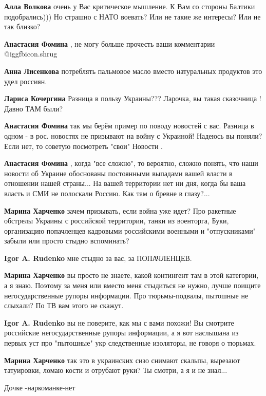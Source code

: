 \begin{itemize}
\begin{itemize}
\textbf{Алла Волкова} очень у Вас критическое мышление. К Вам со стороны Балтики подобрались))) Но страшно с НАТО воевать? Или не такие же интересы? Или не так близко?

\textbf{Анастасия Фомина} , не могу больше прочесть ваши комментарии  @igg{fbicon.shrug} 

\textbf{Анна Лисенкова} потреблять пальмовое масло вместо натуральных продуктов это удел россиян.

\textbf{Лариса Кочергина} Разница в пользу Украины??? Ларочка, вы такая сказочница !
Давно ТАМ были?

\textbf{Анастасия Фомина} так мы берём пример по поводу новостей с вас. Разница в одном - в рос. новостях не призывают на войну с Украиной! Надеюсь вы поняли? Если нет, то советую посмотреть "свои" Новости .

\textbf{Анастасия Фомина} , когда "все сложно", то вероятно, сложно понять, что наши новости об Украине обоснованы постоянными выпадами вашей власти в отношении нашей страны... На вашей территории нет ни дня, когда бы ваша власть и СМИ не полоскали Россию. Как там о бревне в глазу?...

\textbf{Марина Харченко} зачем призывать, если война уже идет? Про ракетные обстрелы Украины с российской территории, танки из военторга, Буки, организацию попачленцев кадровыми российскими военными и "отпускниками" забыли или просто стыдно вспоминать?

\textbf{Igor A. Rudenko} мне стыдно за вас, за ПОПАЧЛЕНЦЕВ.

\textbf{Марина Харченко} вы просто не знаете, какой контингент там в этой категории, а я знаю. Поэтому за меня или вместо меня стыдиться не нужно, лучше поищите негосударственные рупоры информации. Про тюрьмы-подвалы, пытошные не слыхали? По ТВ вам этого не скажут.

\textbf{Igor A. Rudenko} вы не поверите, как мы с вами похожи! Вы смотрите российские негосударственные рупоры информации, а я вот наслышана из первых уст про "пытошные" укр следственные изоляторы, не говоря о тюрьмах.

\textbf{Марина Харченко} так это в украинских сизо снимают скальпы, вырезают татуировки, ломаю кости и отрубают руки? Ты смотри, а я и не знал...

Дочке -наркоманке-нет


\end{itemize}
\end{itemize}

